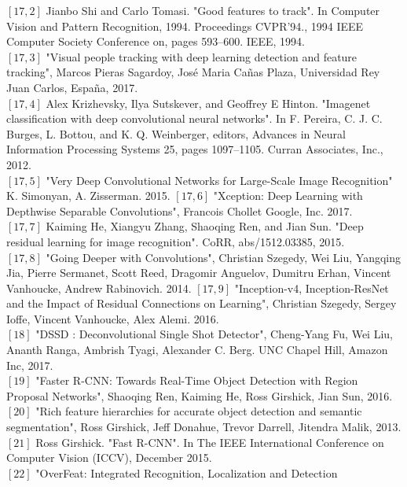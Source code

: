 \documentclass{bmvc2k}
\begin{document}
$\left[17,2\right]$  Jianbo Shi and Carlo Tomasi. "Good features to track". In Computer Vision and
Pattern Recognition, 1994. Proceedings CVPR’94., 1994 IEEE Computer Society
Conference on, pages 593–600. IEEE, 1994.\\
$\left[17,3\right]$  "Visual people tracking with deep learning
detection and feature tracking", Marcos Pieras Sagardoy, José Maria Cañas Plaza, Universidad Rey Juan Carlos, España, 2017.\\
$\left[17,4\right]$  Alex Krizhevsky, Ilya Sutskever, and Geoffrey E Hinton. "Imagenet classification with
deep convolutional neural networks". In F. Pereira, C. J. C. Burges, L. Bottou, and
K. Q. Weinberger, editors, Advances in Neural Information Processing Systems 25,
pages 1097–1105. Curran Associates, Inc., 2012.\\
$\left[17,5\right]$  "Very Deep Convolutional Networks for Large-Scale Image Recognition"
K. Simonyan, A. Zisserman. 2015.
$\left[17,6\right]$  "Xception: Deep Learning with Depthwise Separable Convolutions",
Francois Chollet
Google, Inc. 2017.\\
$\left[17,7\right]$  Kaiming He, Xiangyu Zhang, Shaoqing Ren, and Jian Sun. "Deep residual learning
for image recognition". CoRR, abs/1512.03385, 2015.\\
$\left[17,8\right]$  "Going Deeper with Convolutions", Christian Szegedy, Wei Liu, Yangqing Jia, Pierre Sermanet, Scott Reed, Dragomir Anguelov, Dumitru Erhan, Vincent Vanhoucke, Andrew Rabinovich. 2014.
$\left[17,9\right]$  "Inception-v4, Inception-ResNet and the Impact of Residual Connections on Learning",
Christian Szegedy, Sergey Ioffe, Vincent Vanhoucke, Alex Alemi. 2016.\\
$\left[18\right]$  "DSSD : Deconvolutional Single Shot Detector",
Cheng-Yang Fu, Wei Liu, Ananth Ranga, Ambrish Tyagi, Alexander C. Berg. UNC Chapel Hill,
Amazon Inc, 2017.\\
$\left[19\right]$  "Faster R-CNN: Towards Real-Time Object Detection with Region Proposal Networks",
Shaoqing Ren, Kaiming He, Ross Girshick, Jian Sun, 2016.\\
$\left[20\right]$  "Rich feature hierarchies for accurate object detection and semantic segmentation",
Ross Girshick, Jeff Donahue, Trevor Darrell, Jitendra Malik, 2013.\\
$\left[21\right]$  Ross Girshick. "Fast R-CNN". In The IEEE International Conference on Computer
Vision (ICCV), December 2015.\\
$\left[22\right]$  "OverFeat:
Integrated Recognition, Localization and Detection
\end{document}
